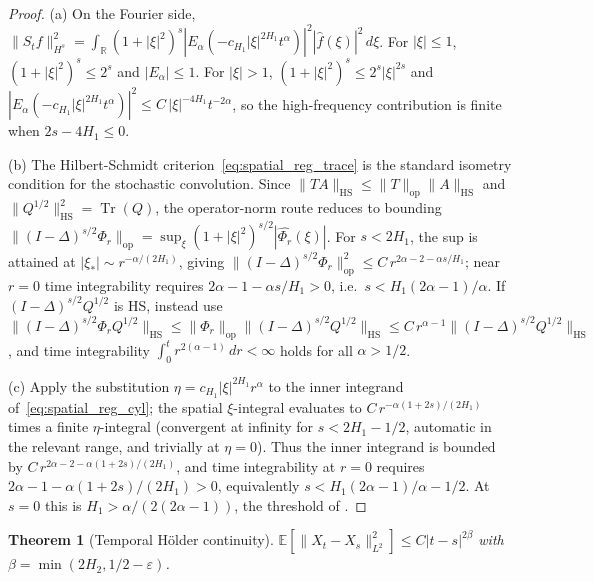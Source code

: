\documentclass[11pt]{article}
\newtheorem{theorem}{Theorem}[section]
\theoremstyle{definition}
\theoremstyle{remark}
\DeclareMathOperator{\Tr}{Tr}
\newcommand{\E}{\mathbb{E}}
\newcommand{\R}{\mathbb{R}}
\newcommand{\norm}[1]{\| #1 \|}
\begin{document}
\begin{proof}
(a) On the Fourier side,
$\norm{S_t f}_{H^s}^2 = \int_\R (1+|\xi|^2)^s
|E_\alpha(-c_{H_1}|\xi|^{2H_1} t^\alpha)|^2 |\hat f(\xi)|^2\,
d\xi$.  For $|\xi| \leq 1$, $(1+|\xi|^2)^s \leq 2^s$ and
$|E_\alpha| \leq 1$.  For $|\xi| > 1$,
$(1+|\xi|^2)^s \leq 2^s |\xi|^{2s}$ and
$|E_\alpha(-c_{H_1}|\xi|^{2H_1} t^\alpha)|^2 \leq C\,
|\xi|^{-4H_1} t^{-2\alpha}$, so the high-frequency
contribution is finite when $2s - 4H_1 \leq 0$.

(b) The Hilbert-Schmidt criterion~\eqref{eq:spatial_reg_trace}
is the standard isometry condition for the stochastic
convolution.  Since $\norm{T A}_{\mathrm{HS}}
\leq \norm{T}_{\mathrm{op}}\norm{A}_{\mathrm{HS}}$ and
$\norm{Q^{1/2}}_{\mathrm{HS}}^2 = \Tr(Q)$, the
operator-norm route reduces to bounding
$\norm{(I-\Delta)^{s/2}\Phi_r}_{\mathrm{op}}
= \sup_\xi (1+|\xi|^2)^{s/2}|\widehat{\Phi_r}(\xi)|$.
For $s < 2H_1$, the sup is attained at
$|\xi_*| \sim r^{-\alpha/(2H_1)}$, giving
$\norm{(I-\Delta)^{s/2}\Phi_r}_{\mathrm{op}}^2
\leq C\, r^{2\alpha - 2 - \alpha s/H_1}$;
near $r = 0$ time integrability requires
$2\alpha - 1 - \alpha s/H_1 > 0$, i.e.\
$s < H_1(2\alpha - 1)/\alpha$.  If
$(I-\Delta)^{s/2}Q^{1/2}$ is HS, instead use
$\norm{(I-\Delta)^{s/2}\Phi_r Q^{1/2}}_{\mathrm{HS}}
\leq \norm{\Phi_r}_{\mathrm{op}}
\norm{(I-\Delta)^{s/2}Q^{1/2}}_{\mathrm{HS}}
\leq C\,r^{\alpha-1}\norm{(I-\Delta)^{s/2}Q^{1/2}}_{\mathrm{HS}}$,
and time integrability $\int_0^t r^{2(\alpha-1)}\,dr
< \infty$ holds for all $\alpha > 1/2$.

(c) Apply the substitution
$\eta = c_{H_1}|\xi|^{2H_1} r^\alpha$ to the inner
integrand of~\eqref{eq:spatial_reg_cyl}; the spatial
$\xi$-integral evaluates to
$C\, r^{-\alpha(1+2s)/(2H_1)}$ times a finite
$\eta$-integral (convergent at infinity for
$s < 2H_1 - 1/2$, automatic in the relevant range, and
trivially at $\eta = 0$).  Thus the inner integrand is
bounded by $C\,r^{2\alpha - 2 - \alpha(1+2s)/(2H_1)}$, and
time integrability at $r = 0$ requires
$2\alpha - 1 - \alpha(1+2s)/(2H_1) > 0$, equivalently
$s < H_1(2\alpha - 1)/\alpha - 1/2$.  At $s = 0$ this is
$H_1 > \alpha/(2(2\alpha-1))$, the threshold of
.
\end{proof}

\begin{theorem}[Temporal H\"older continuity]\label{thm:temporal_reg}
$\E[\norm{X_t - X_s}_{L^2}^2] \leq C|t-s|^{2\beta}$ with $\beta = \min(2H_2, 1/2 - \varepsilon)$.
\end{theorem}
\end{document}
